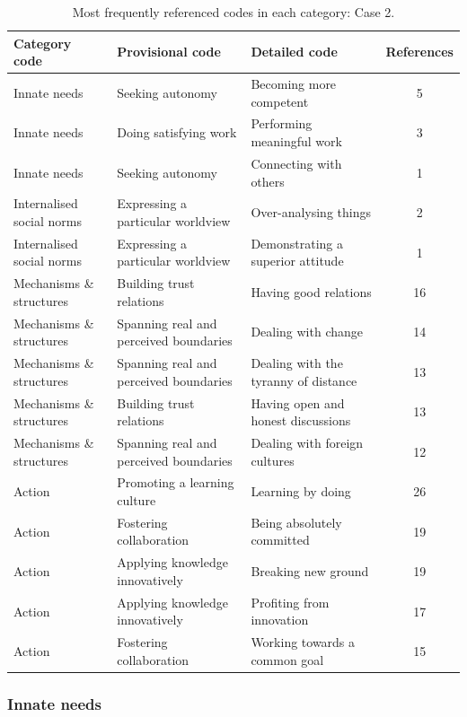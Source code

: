 \begin{table}
\centering
\caption{Most frequently referenced codes in each category: Case 2.}
\label{tab:case_2_codes}
\begin{tabular}{lllc}
\toprule
Category code & Provisional code & Detailed code & References \\ 
\midrule
Innate needs & Seeking autonomy & Becoming more competent &   5 \\ 
Innate needs & Doing satisfying work & Performing meaningful work &   3 \\ 
Innate needs & Seeking autonomy & Connecting with others &   1 \\ 
Internalised social norms & Expressing a particular worldview & Over-analysing things &   2 \\ 
Internalised social norms & Expressing a particular worldview & Demonstrating a superior attitude &   1 \\ 
Mechanisms \& structures & Building trust relations & Having good relations &  16 \\ 
Mechanisms \& structures & Spanning real and perceived boundaries & Dealing with change &  14 \\ 
Mechanisms \& structures & Spanning real and perceived boundaries & Dealing with the tyranny of distance &  13 \\ 
Mechanisms \& structures & Building trust relations & Having open and honest discussions &  13 \\ 
Mechanisms \& structures & Spanning real and perceived boundaries & Dealing with foreign cultures &  12 \\ 
Action & Promoting a learning culture & Learning by doing &  26 \\ 
Action & Fostering collaboration & Being absolutely committed &  19 \\ 
Action & Applying knowledge innovatively & Breaking new ground &  19 \\ 
Action & Applying knowledge innovatively & Profiting from innovation &  17 \\ 
Action & Fostering collaboration & Working towards a common goal &  15 \\ 
\bottomrule
\end{tabular}
\end{table}

\subsubsection{Innate needs}

